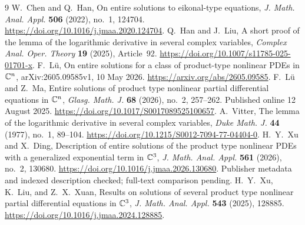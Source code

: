 \begin{thebibliography}{9}
 W.~Chen and Q.~Han,
On entire solutions to eikonal-type equations,
\emph{J. Math. Anal. Appl.} \textbf{506} (2022), no.~1, 124704.
\url{https://doi.org/10.1016/j.jmaa.2020.124704}.
 Q.~Han and J.~Liu,
A short proof of the lemma of the logarithmic derivative in several complex variables,
\emph{Complex Anal. Oper. Theory} \textbf{19} (2025), Article~92.
\url{https://doi.org/10.1007/s11785-025-01701-x}.
 F.~L\"u,
On entire solutions for a class of product-type nonlinear PDEs in $\mathbb C^n$,
arXiv:2605.09585v1, 10 May 2026.
\url{https://arxiv.org/abs/2605.09585}.
 F.~L\"u and Z.~Ma,
Entire solutions of product type nonlinear partial differential equations in $\mathbb C^n$,
\emph{Glasg. Math. J.} \textbf{68} (2026), no.~2, 257--262.
Published online 12 August 2025.
\url{https://doi.org/10.1017/S0017089525100657}.
 A.~Vitter,
The lemma of the logarithmic derivative in several complex variables,
\emph{Duke Math. J.} \textbf{44} (1977), no.~1, 89--104.
\url{https://doi.org/10.1215/S0012-7094-77-04404-0}.
 H.~Y.~Xu and X.~Ding,
Description of entire solutions of the product type nonlinear PDEs with a
 generalized exponential term in $\mathbb C^3$,
\emph{J. Math. Anal. Appl.} \textbf{561} (2026), no.~2, 130680.
\url{https://doi.org/10.1016/j.jmaa.2026.130680}.
Publisher metadata and indexed description checked; full-text comparison pending.
 H.~Y.~Xu, K.~Liu, and Z.~X.~Xuan,
Results on solutions of several product type nonlinear partial differential
equations in $\mathbb C^3$,
\emph{J. Math. Anal. Appl.} \textbf{543} (2025), 128885.
\url{https://doi.org/10.1016/j.jmaa.2024.128885}.
\end{thebibliography}
